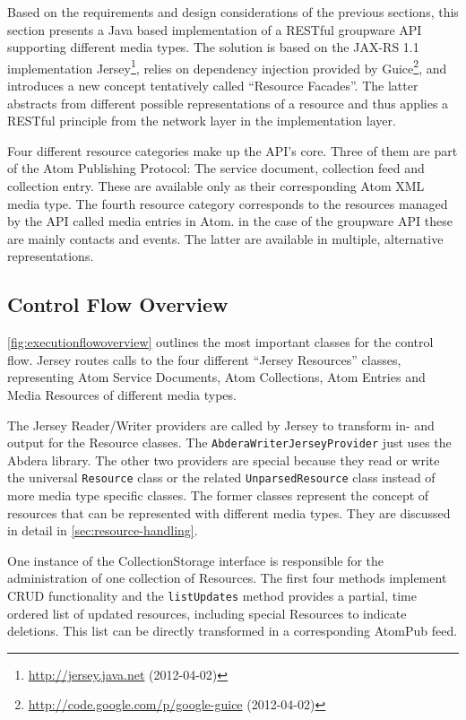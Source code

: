 \documentclass[11pt,a4paper,headsepline,twoside]{scrartcl}		%
\newcommand{\citeurl}[2]{\url{#1} (#2)}
\begin{document}
Based on the requirements and design considerations of the previous sections,
this section presents a Java based implementation of a RESTful groupware API
supporting different media types. The solution is based on the JAX-RS 1.1
\cite{JAX-RS1.1} implementation
Jersey\footnote{\citeurl{http://jersey.java.net}{2012-04-02}}, relies on
dependency injection provided by
Guice\footnote{\citeurl{http://code.google.com/p/google-guice}{2012-04-02}}, and
introduces a new concept tentatively called ``Resource Facades''. The latter
abstracts from different possible representations of a resource and thus applies
a RESTful principle from the network layer in the implementation layer.

Four different resource categories make up the API's core. Three of them are
part of the Atom Publishing Protocol: The service document, collection feed and
collection entry. These are available only as their corresponding Atom XML media
type. The fourth resource category corresponds to the resources managed by the
API called media entries in Atom. in the case of the groupware API these are
mainly contacts and events. The latter are available in multiple, alternative
representations.

\subsection{Control Flow Overview}
\label{sec:overview}


\autoref{fig:executionflowoverview} outlines the most important classes for the
control flow. Jersey routes calls to the four different ``Jersey Resources''
classes, representing Atom Service Documents, Atom Collections, Atom Entries and
Media Resources of different media types.

The Jersey Reader/Writer providers are called by Jersey to transform in- and
output for the Resource classes. The \lstinline:AbderaWriterJerseyProvider: just
uses the Abdera library. The other two providers are special because they read
or write the universal \lstinline:Resource: class or the related
\lstinline:UnparsedResource: class instead of more media type specific
classes. The former classes represent the concept of resources that can be
represented with different media types. They are discussed in detail in
\autoref{sec:resource-handling}.

One instance of the CollectionStorage interface is responsible for the
administration of one collection of Resources. The first four methods implement
CRUD functionality and the \lstinline:listUpdates: method provides a partial,
time ordered list of updated resources, including special Resources to indicate
deletions. This list can be directly transformed in a corresponding AtomPub
feed.
\end{document}
